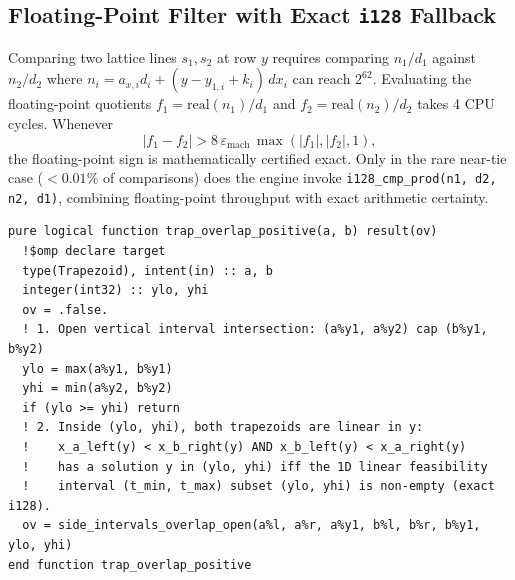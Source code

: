 \subsection{Floating-Point Filter with Exact \texttt{i128} Fallback}

Comparing two lattice lines $s_1, s_2$ at row $y$ requires comparing $n_1/d_1$ against $n_2/d_2$ where $n_i = a_{x,i} d_i + (y - y_{1,i} + k_i)\,dx_i$ can reach $2^{62}$. Evaluating the floating-point quotients $f_1 = \text{real}(n_1)/d_1$ and $f_2 = \text{real}(n_2)/d_2$ takes 4 CPU cycles. Whenever
\[
  |f_1 - f_2| > 8\,\varepsilon_{\text{mach}}\,\max(|f_1|, |f_2|, 1),
\]
the floating-point sign is mathematically certified exact. Only in the rare near-tie case ($< 0.01\%$ of comparisons) does the engine invoke \texttt{i128\_cmp\_prod(n1, d2, n2, d1)}, combining floating-point throughput with exact arithmetic certainty.

\begin{lstlisting}[caption={Exact separating-axis interior overlap test (\texttt{trap\_overlap\_positive}) structure in \texttt{src/trapezoid.f90}.},label={lst:trap_overlap}]
pure logical function trap_overlap_positive(a, b) result(ov)
  !$omp declare target
  type(Trapezoid), intent(in) :: a, b
  integer(int32) :: ylo, yhi
  ov = .false.
  ! 1. Open vertical interval intersection: (a%y1, a%y2) cap (b%y1, b%y2)
  ylo = max(a%y1, b%y1)
  yhi = min(a%y2, b%y2)
  if (ylo >= yhi) return
  ! 2. Inside (ylo, yhi), both trapezoids are linear in y:
  !    x_a_left(y) < x_b_right(y) AND x_b_left(y) < x_a_right(y)
  !    has a solution y in (ylo, yhi) iff the 1D linear feasibility
  !    interval (t_min, t_max) subset (ylo, yhi) is non-empty (exact i128).
  ov = side_intervals_overlap_open(a%l, a%r, a%y1, b%l, b%r, b%y1, ylo, yhi)
end function trap_overlap_positive
\end{lstlisting}

